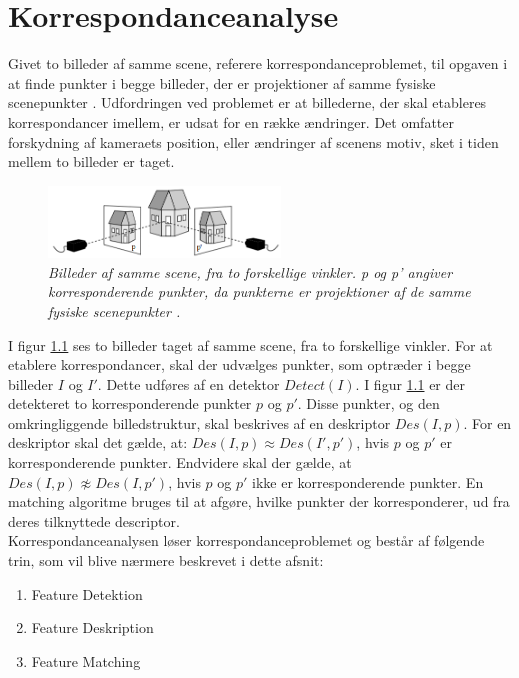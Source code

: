 
\chapter{Korrespondanceanalyse}
Givet to billeder af samme scene, referere korrespondanceproblemet, til opgaven i at finde punkter i begge billeder, der er projektioner af samme fysiske scenepunkter \cite{Stefano}.  Udfordringen ved problemet er at billederne, der skal etableres korrespondancer imellem, er udsat for en række ændringer. Det omfatter forskydning af kameraets position, eller ændringer af scenens motiv, sket i tiden mellem to billeder er taget. 
\begin{figure}[H]
    \centering
    \includegraphics[width=0.55\textwidth]{fig/3.png}
     \vspace{-1em}
    \begin{center}    
       \caption{{\footnotesize \textit{Billeder af samme scene, fra to forskellige vinkler. p og p' angiver korresponderende punkter, da punkterne er projektioner af de samme fysiske scenepunkter \cite{kim}.}}}
    \label{fig:1}
     \end{center}
     \vspace{-2.5em}
  \end{figure} \noindent
I figur \ref{fig:1} ses to billeder taget af samme scene, fra to forskellige vinkler. For at etablere korrespondancer, skal der udvælges punkter, som optræder i begge billeder $I$ og $I'$. Dette udføres af en detektor $Detect(I)$. I figur \ref{fig:1} er der detekteret to korresponderende punkter $p$ og $p'$. Disse punkter, og den omkringliggende billedstruktur, skal beskrives af en deskriptor $Des(I,p)$. %
For en deskriptor skal det gælde, at: $Des(I,p)\approx Des(I',p')$, hvis $p$ og $p'$ er korresponderende punkter.  Endvidere skal der gælde, at $Des(I,p)\not \approx Des(I,p')$, hvis $p$ og $p'$ ikke er korresponderende punkter. En matching algoritme bruges til at afgøre, hvilke punkter der korresponderer, ud fra deres tilknyttede descriptor. \\
Korrespondanceanalysen løser korrespondanceproblemet og består af følgende trin, som vil blive nærmere beskrevet i dette afsnit:
\begin{enumerate}
\item{Feature Detektion}
\item{Feature Deskription}
\item{Feature Matching}
\end{enumerate}


